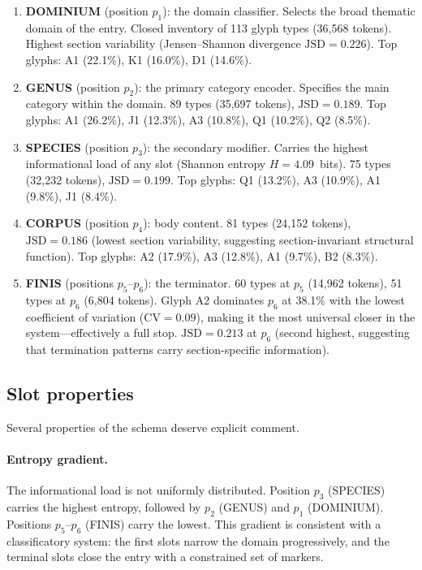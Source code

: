 \begin{enumerate}[nosep]
  \item \textbf{DOMINIUM} (position $p_1$): the domain classifier.
    Selects the broad thematic domain of the entry. Closed inventory
    of 113 glyph types (36,568 tokens). Highest section variability
    (Jensen--Shannon divergence $\text{JSD} = 0.226$). Top glyphs:
    A1 (22.1\%), K1 (16.0\%), D1 (14.6\%).
  \item \textbf{GENUS} (position $p_2$): the primary category encoder.
    Specifies the main category within the domain. 89 types (35,697
    tokens), $\text{JSD} = 0.189$. Top glyphs: A1 (26.2\%), J1
    (12.3\%), A3 (10.8\%), Q1 (10.2\%), Q2 (8.5\%).
  \item \textbf{SPECIES} (position $p_3$): the secondary modifier.
    Carries the highest informational load of any slot (Shannon entropy
    $H = 4.09$~bits). 75 types (32,232 tokens), $\text{JSD} = 0.199$.
    Top glyphs: Q1 (13.2\%), A3 (10.9\%), A1 (9.8\%), J1 (8.4\%).
  \item \textbf{CORPUS} (position $p_4$): body content. 81 types
    (24,152 tokens), $\text{JSD} = 0.186$ (lowest section variability,
    suggesting section-invariant structural function). Top glyphs:
    A2 (17.9\%), A3 (12.8\%), A1 (9.7\%), B2 (8.3\%).
  \item \textbf{FINIS} (positions $p_5$--$p_6$): the terminator.
    60 types at $p_5$ (14,962 tokens), 51 types at $p_6$ (6,804
    tokens). Glyph A2 dominates $p_6$ at 38.1\% with the lowest
    coefficient of variation ($\text{CV} = 0.09$), making it the most
    universal closer in the system---effectively a full stop.
    $\text{JSD} = 0.213$ at $p_6$ (second highest, suggesting that
    termination patterns carry section-specific information).
\end{enumerate}

\subsection{Slot properties}

Several properties of the schema deserve explicit comment.

\paragraph{Entropy gradient.}
The informational load is not uniformly distributed. Position $p_3$
(SPECIES) carries the highest entropy, followed by $p_2$ (GENUS) and
$p_1$ (DOMINIUM). Positions $p_5$--$p_6$ (FINIS) carry the lowest.
This gradient is consistent with a classificatory system: the first
slots narrow the domain progressively, and the terminal slots close
the entry with a constrained set of markers.

